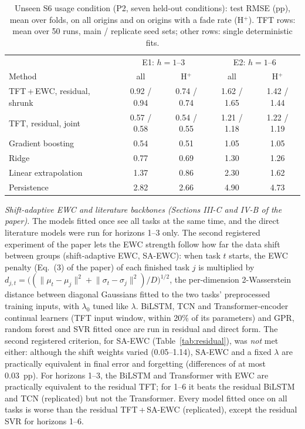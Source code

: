 \documentclass[conference]{IEEEtran}
\begin{document}
\begin{table}[t]
  \centering
  \caption{Unseen S6 usage condition (P2, seven held-out conditions): test RMSE (pp), mean over folds, on all origins and on origins with a fade rate (H$^+$). TFT rows: mean over 50 runs, main / replicate seed sets; other rows: single deterministic fits.}
  \label{tab:d26}
  \setlength{\tabcolsep}{2.5pt}
  \scriptsize
  \begin{tabular}{lcccc}
    \toprule
    & \multicolumn{2}{c}{E1: $h{=}1$--3} & \multicolumn{2}{c}{E2: $h{=}1$--6} \\
    Method & all & H$^+$ & all & H$^+$ \\
    \midrule
    TFT\,+\,EWC, residual, shrunk & 0.92 / 0.94 & 0.74 / 0.74 & 1.62 / 1.65 & 1.42 / 1.44 \\
    TFT, residual, joint & 0.57 / 0.58 & 0.54 / 0.55 & 1.21 / 1.18 & 1.22 / 1.19 \\
    \midrule
    Gradient boosting & 0.54 & 0.51 & 1.05 & 1.05 \\
    Ridge & 0.77 & 0.69 & 1.30 & 1.26 \\
    Linear extrapolation & 1.37 & 0.86 & 2.30 & 1.62 \\
    Persistence & 2.82 & 2.66 & 4.90 & 4.73 \\
    \bottomrule
  \end{tabular}
\end{table}



\emph{Shift-adaptive EWC and literature backbones (Sections III-C and IV-B of the paper).} The models fitted once see all tasks at the same time, and the direct literature models were run for horizons 1--3 only. The second registered experiment of the paper lets the EWC strength follow how far the data shift between groups (shift-adaptive EWC, SA-EWC): when task $t$ starts, the EWC penalty (Eq.~(3) of the paper) of each finished task $j$ is multiplied by $d_{j,t}=\big((\lVert\mu_t-\mu_j\rVert^2+\lVert\sigma_t-\sigma_j\rVert^2)/D\big)^{1/2}$, the per-dimension 2-Wasserstein distance between diagonal Gaussians fitted to the two tasks' preprocessed training inputs, with $\lambda_0$ tuned like $\lambda$. BiLSTM, TCN and Transformer-encoder continual learners (TFT input window, within 20\% of its parameters) and GPR, random forest and SVR fitted once are run in residual and direct form. The second registered criterion, for SA-EWC (Table~\ref{tab:residual}), was \emph{not} met either: although the shift weights varied (0.05--1.14), SA-EWC and a fixed $\lambda$ are practically equivalent in final error and forgetting (differences of at most 0.03~pp). For horizons 1--3, the BiLSTM and Transformer with EWC are practically equivalent to the residual TFT; for 1--6 it beats the residual BiLSTM and TCN (replicated) but not the Transformer. Every model fitted once on all tasks is worse than the residual TFT\,+\,SA-EWC (replicated), except the residual SVR for horizons 1--6.
\end{document}
